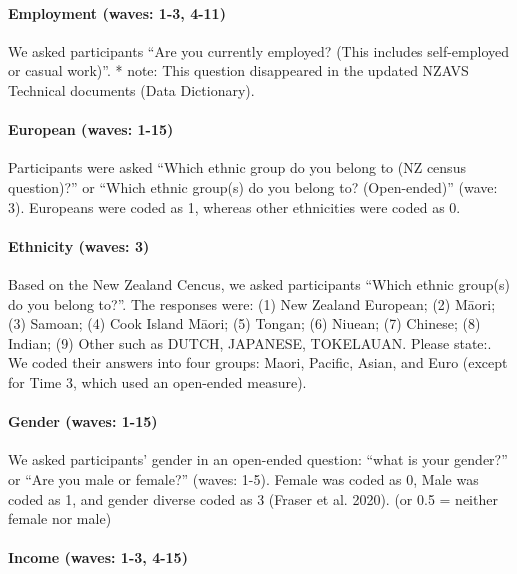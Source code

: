 \documentclass[
  letterpaper,
  DIV=11,
  numbers=noendperiod]{scrartcl}
\let\oldparagraph\paragraph
\renewcommand{\paragraph}[1]{\oldparagraph{#1}\mbox{}}
\begin{document}
\hypertarget{employment-waves-1-3-4-11}{%
\paragraph{Employment (waves: 1-3,
4-11)}\label{employment-waves-1-3-4-11}}

We asked participants ``Are you currently employed? (This includes
self-employed or casual work)''. * note: This question disappeared in
the updated NZAVS Technical documents (Data Dictionary).

\hypertarget{european-waves-1-15}{%
\paragraph{European (waves: 1-15)}\label{european-waves-1-15}}

Participants were asked ``Which ethnic group do you belong to (NZ census
question)?'' or ``Which ethnic group(s) do you belong to? (Open-ended)''
(wave: 3). Europeans were coded as 1, whereas other ethnicities were
coded as 0.

\hypertarget{ethnicity-waves-3}{%
\paragraph{Ethnicity (waves: 3)}\label{ethnicity-waves-3}}

Based on the New Zealand Cencus, we asked participants ``Which ethnic
group(s) do you belong to?''. The responses were: (1) New Zealand
European; (2) Māori; (3) Samoan; (4) Cook Island Māori; (5) Tongan; (6)
Niuean; (7) Chinese; (8) Indian; (9) Other such as DUTCH, JAPANESE,
TOKELAUAN. Please state:. We coded their answers into four groups:
Maori, Pacific, Asian, and Euro (except for Time 3, which used an
open-ended measure).

\hypertarget{gender-waves-1-15}{%
\paragraph{Gender (waves: 1-15)}\label{gender-waves-1-15}}

We asked participants' gender in an open-ended question: ``what is your
gender?'' or ``Are you male or female?'' (waves: 1-5). Female was coded
as 0, Male was coded as 1, and gender diverse coded as 3 (Fraser et al.
2020). (or 0.5 = neither female nor male)

\hypertarget{income-waves-1-3-4-15}{%
\paragraph{Income (waves: 1-3, 4-15)}\label{income-waves-1-3-4-15}}
\end{document}
